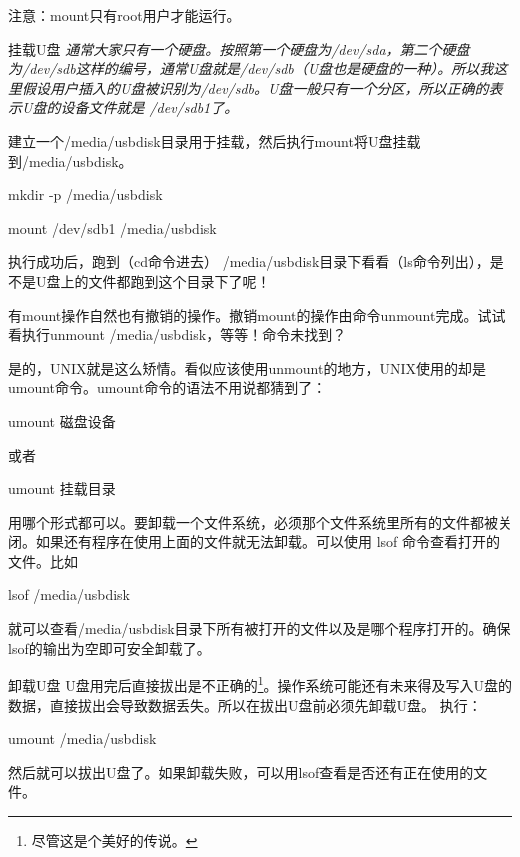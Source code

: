 \begin{notice}
注意：mount只有root用户才能运行。
\end{notice}

\begin{example}{挂载U盘}
\it 通常大家只有一个硬盘。按照第一个硬盘为/dev/sda，第二个硬盘为/dev/sdb这样的编号，通常U盘就是/dev/sdb（U盘也是硬盘的一种）。所以我这里假设用户插入的U盘被识别为/dev/sdb。U盘一般只有一个分区，所以正确的表示U盘的设备文件就是 /dev/sdb1了。

\normalfont

建立一个/media/usbdisk目录用于挂载，然后执行mount将U盘挂载到/media/usbdisk。

\begin{code}
mkdir -p /media/usbdisk

mount /dev/sdb1 /media/usbdisk
\end{code}

执行成功后，跑到（cd命令进去） /media/usbdisk目录下看看（ls命令列出），是不是U盘上的文件都跑到这个目录下了呢！

\end{example}


有mount操作自然也有撤销的操作。撤销mount的操作由命令unmount完成。试试看执行unmount /media/usbdisk，等等！命令未找到？

是的，UNIX就是这么矫情。看似应该使用unmount的地方，UNIX使用的却是umount命令。umount命令的语法不用说都猜到了：
\begin{code}
umount 磁盘设备
\end{code}
或者
\begin{code}
umount 挂载目录
\end{code}

用哪个形式都可以。要卸载一个文件系统，必须那个文件系统里所有的文件都被关闭。如果还有程序在使用上面的文件就无法卸载。可以使用 lsof 命令查看打开的文件。比如
\begin{code}
lsof /media/usbdisk
\end{code}
就可以查看/media/usbdisk目录下所有被打开的文件以及是哪个程序打开的。确保lsof的输出为空即可安全卸载了。

\begin{example}{卸载U盘}
U盘用完后直接拔出是不正确的\footnote{尽管这是个美好的传说。}。操作系统可能还有未来得及写入U盘的数据，直接拔出会导致数据丢失。所以在拔出U盘前必须先卸载U盘。
执行：
\begin{code}
umount /media/usbdisk
\end{code}

然后就可以拔出U盘了。如果卸载失败，可以用lsof查看是否还有正在使用的文件。

\end{example}

